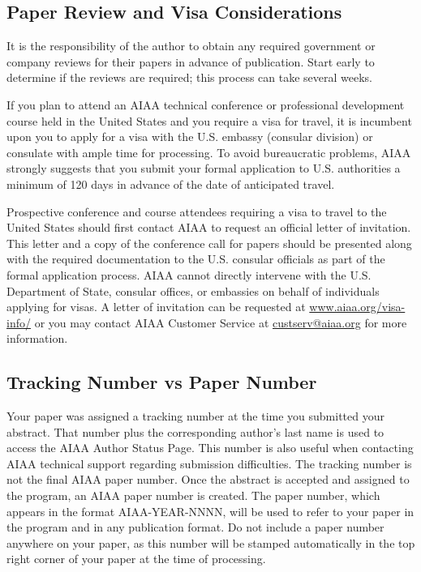\documentclass{aiaa-tc}%
\begin{document}
\subsection{Paper Review and Visa Considerations}

It is the responsibility of the author to obtain any required government or
company reviews for their papers in advance of publication.
Start early to determine if the reviews are required; this process can
take several weeks.

If you plan to attend an AIAA technical conference or professional
development course held in the United States and you require a visa for
travel, it is incumbent upon you to apply for a visa with the
U.S. embassy (consular division) or consulate with ample time for
processing.
To avoid bureaucratic problems, AIAA strongly suggests that you submit
your formal application to U.S. authorities a minimum of 120 days in
advance of the date of anticipated travel.

Prospective conference and course attendees requiring a visa to travel
to the United States should first contact AIAA to request an official
letter of invitation.
This letter and a copy of the conference call for papers should be presented
along with the required documentation to the U.S. consular officials as part of
the formal application process.
AIAA cannot directly intervene with the U.S. Department of State,
consular offices, or embassies on behalf of individuals applying for visas.
A letter of invitation can be requested at
\href{http://www.aiaa.org/visa-info/}{www.aiaa.org/visa-info/} or you
may contact AIAA Customer Service at
\href{mailto:custserv@aiaa.org?subject=visa}{custserv@aiaa.org} for more
information.

\subsection{Tracking Number vs Paper Number}

Your paper was assigned a tracking number at the time you submitted
your abstract.
That number plus the corresponding author's last name is used to access
the AIAA Author Status Page.
This number is also useful when contacting AIAA technical support
regarding submission difficulties.
The tracking number is not the final AIAA paper number.
Once the abstract is accepted and assigned to the program, an AIAA
paper number is created.
The paper number, which appears in the format
{\footnotesize\textsf{AIAA-YEAR-NNNN}}, will be used to refer to your
paper in the program and in any publication format.
Do not include a paper number anywhere on your paper, as this number
will be stamped automatically in the top right corner of your paper at
the time of processing.
\end{document}
